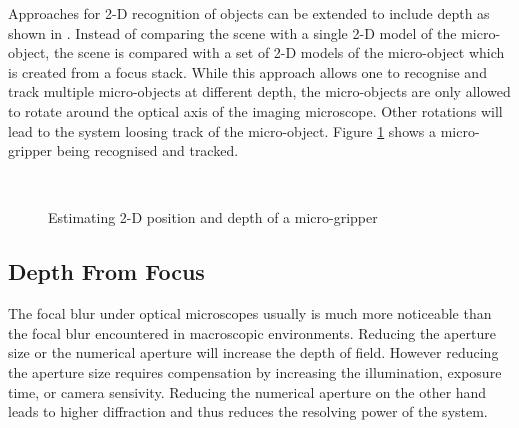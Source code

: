 \documentclass[a4paper,12pt]{book}
\begin{document}
Approaches for 2-D recognition of objects can be extended to include depth
as shown in \cite{RefWorks:431}. Instead of comparing the scene with a single
2-D model of the micro-object, the scene is compared with a set of 2-D models
of the micro-object which is created from a focus stack. While this approach
allows one to recognise and track multiple micro-objects at different depth,
the micro-objects are only allowed to rotate around the optical axis of the
imaging microscope. Other rotations will lead to the system loosing track of
the micro-object. Figure \ref{fig:gripper} shows a micro-gripper being
recognised and tracked.
\begin{figure}[htbp]
   \begin{center}
     \\
     \caption{Estimating 2-D position and depth of a
       micro-gripper\cite{RefWorks:431}\label{fig:gripper}}
   \end{center}
\end{figure}

\subsection{Depth From Focus}
The focal blur under optical microscopes usually is much more noticeable than
the focal blur encountered in macroscopic environments. Reducing the
aperture size or the numerical aperture will increase the depth of field.
However reducing the aperture size requires compensation by increasing the
illumination, exposure time, or camera sensivity. Reducing the numerical
aperture on the other hand leads to higher diffraction and thus reduces the
resolving power of the system.
\end{document}
